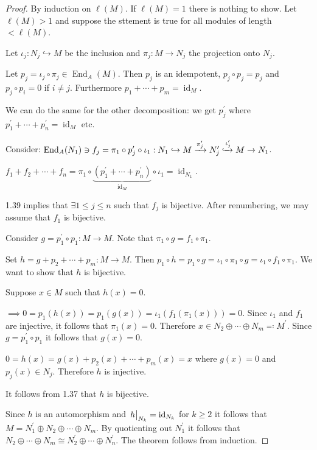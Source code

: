 \documentclass{article}
\theoremstyle{definition}
\theoremstyle{plain}
\theoremstyle{remark}
\begin{document}
    \begin{proof}
        By induction on \(\ell(M)\). If \(\ell(M) = 1\) there is nothing to show. Let \(\ell(M) > 1\) and suppose the sttement is true for all modules of length \(< \ell(M)\).

        Let \(\iota_j : N_j \hookrightarrow M\) be the inclusion and \(\pi_j: M \to N_j\) the projection onto \(N_j\).

        Let \(p_j = \iota_j \circ \pi_j \in \operatorname{End}_A(M)\). Then \(p_j\) is an idempotent, \(p_j \circ p_j = p_j\) and \(p_j \circ p_i = 0\) if \(i\neq j\). Furthermore \(p_1 + \cdots + p_m = \operatorname{id}_{M}\).

        We can do the same for the other decomposition: we get \(p_j^{\prime}\) where \(p^{\prime}_1 + \cdots + p^{\prime}_n = \operatorname{id}_{M}\) etc.
        
        Consider: \(\operatorname{End}_A(N_1)\ni f_j = \pi_1 \circ p_j^{\prime} \circ \iota_1: N_1 \hookrightarrow M \xrightarrow{\pi_j^{\prime}} N^{\prime}_j \xhookrightarrow{\iota^{\prime}_j} M \to N_1\).
        
        \(f_1 + f_2 + \cdots + f_n = \pi_1 \circ  \underbrace{(p^{\prime}_1 + \cdots +p^{\prime}_n)}_{\operatorname{id}_{M}} \circ \iota_1 = \operatorname{id}_{N_1}\).        

        1.39 implies that \(\exists 1 \leq j \leq n\) such that \(f_j\) is bijective. After renumbering, we may assume that \(f_1\) is bijective.

        Consider \(g=p^{\prime}_1 \circ p_1: M \to M\). Note that \(\pi_1 \circ g = f_1 \circ \pi_1\).


        Set \(h = g + p_2 + \cdots + p_m : M \to M\). Then \(p_1 \circ h = p_1 \circ  g = \iota_1 \circ \pi_1 \circ g = \iota_1 \circ f_1 \circ \pi_1\). We want to show that \(h\) is bijective.

        Suppose \(x\in M\) such that \(h(x) = 0\).

        \(\implies 0 = p_1(h(x)) = p_1(g(x)) = \iota_1(f_1(\pi_1(x))) = 0\). Since \(\iota_1\) and \(f_1\) are injective, it follows that \(\pi_1(x) = 0\). Therefore \(x\in N_2 \oplus \cdots \oplus N_m \eqqcolon M^{\prime}\). Since \(g = p^{\prime}_1 \circ p_1\) it follows that \(g(x) = 0\).

        \(0 = h(x) = g(x) + p_2(x) + \cdots + p_m(x) = x\) where \(g(x) = 0\) and \(p_j(x) \in N_j\). Therefore \(h\) is injective.

        It follows from 1.37 that \(h\) is bijective.

        Since \(h\) is an automorphism and \(\eval{h}_{N_k} = \operatorname{id}_{N_k}\) for \(k \geq 2\) it follows that \(M = N^{\prime}_1 \oplus N_2 \oplus \cdots \oplus N_m\). By quotienting out \(N^{\prime}_1\) it follows that \(N_2 \oplus \cdots \oplus N_m \cong N^{\prime}_2 \oplus \cdots \oplus N^{\prime}_n\). The theorem follows from induction.

    \end{proof}
    
\end{document}
